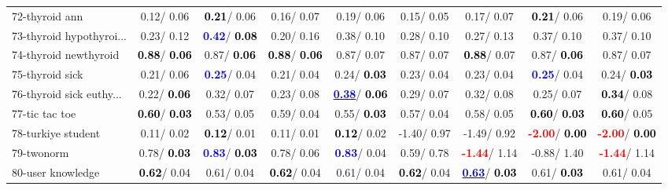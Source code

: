 \begin{table}[h]
\begin{center}
\begin{tabular}{lc|c|c|c|c|c|c|c}
72-thyroid ann &   0.12/  0.06 & \textcolor{black}{\textbf{  0.21}}/  0.06 &   0.16/  0.07 &   0.19/  0.06 &   0.15/  0.05 &   0.17/  0.07 & \textcolor{black}{\textbf{  0.21}}/  0.06 &   0.19/  0.06 \\
73-thyroid hypothyroi... &   0.23/  0.12 & \textcolor{blue}{\textbf{  0.42}}/\textcolor{black}{\textbf{  0.08}} &   0.20/  0.16 &   0.38/  0.10 &   0.28/  0.10 &   0.27/  0.13 &   0.37/  0.10 &   0.37/  0.10 \\
74-thyroid newthyroid & \textcolor{black}{\textbf{  0.88}}/\textcolor{black}{\textbf{  0.06}} &   0.87/\textcolor{black}{\textbf{  0.06}} & \textcolor{black}{\textbf{  0.88}}/\textcolor{black}{\textbf{  0.06}} &   0.87/  0.07 &   0.87/  0.07 & \textcolor{black}{\textbf{  0.88}}/  0.07 &   0.87/\textcolor{black}{\textbf{  0.06}} &   0.87/  0.07 \\
75-thyroid sick &   0.21/  0.06 & \textcolor{blue}{\textbf{  0.25}}/  0.04 &   0.21/  0.04 &   0.24/\textcolor{black}{\textbf{  0.03}} &   0.23/  0.04 &   0.23/  0.04 & \textcolor{blue}{\textbf{  0.25}}/  0.04 &   0.24/\textcolor{black}{\textbf{  0.03}} \\
76-thyroid sick euthy... &   0.22/\textcolor{black}{\textbf{  0.06}} &   0.32/  0.07 &   0.23/  0.08 & \underline{\textcolor{blue}{\textbf{  0.38}}}/\textcolor{black}{\textbf{  0.06}} &   0.29/  0.07 &   0.32/  0.08 &   0.25/  0.07 & \textcolor{black}{\textbf{  0.34}}/  0.08 \\
77-tic tac toe & \textcolor{black}{\textbf{  0.60}}/\textcolor{black}{\textbf{  0.03}} &   0.53/  0.05 &   0.59/  0.04 &   0.55/\textcolor{black}{\textbf{  0.03}} &   0.57/  0.04 &   0.58/  0.05 & \textcolor{black}{\textbf{  0.60}}/\textcolor{black}{\textbf{  0.03}} & \textcolor{black}{\textbf{  0.60}}/  0.05 \\
78-turkiye student &   0.11/  0.02 & \textcolor{black}{\textbf{  0.12}}/  0.01 &   0.11/  0.01 & \textcolor{black}{\textbf{  0.12}}/  0.02 &  -1.40/  0.97 &  -1.49/  0.92 & \textcolor{red}{\textbf{ -2.00}}/\textcolor{black}{\textbf{  0.00}} & \textcolor{red}{\textbf{ -2.00}}/\textcolor{black}{\textbf{  0.00}} \\ \hline
79-twonorm &   0.78/\textcolor{black}{\textbf{  0.03}} & \textcolor{blue}{\textbf{  0.83}}/\textcolor{black}{\textbf{  0.03}} &   0.78/  0.06 & \textcolor{blue}{\textbf{  0.83}}/  0.04 &   0.59/  0.78 & \textcolor{red}{\textbf{ -1.44}}/  1.14 &  -0.88/  1.40 & \textcolor{red}{\textbf{ -1.44}}/  1.14 \\
80-user knowledge & \textcolor{black}{\textbf{  0.62}}/  0.04 &   0.61/  0.04 & \textcolor{black}{\textbf{  0.62}}/  0.04 &   0.61/  0.04 & \textcolor{black}{\textbf{  0.62}}/  0.04 & \underline{\textcolor{blue}{\textbf{  0.63}}}/\textcolor{black}{\textbf{  0.03}} &   0.61/\textcolor{black}{\textbf{  0.03}} &   0.61/  0.04 \\

\end{tabular}
\end{center}
\end{table}
